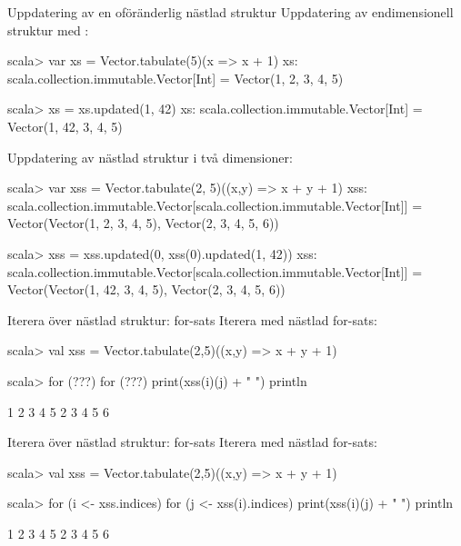 \begin{Slide}{Uppdatering av en oföränderlig nästlad struktur}\SlideFontSmall
Uppdatering av endimensionell struktur med :\\
{\SlideFontTiny{} }
\begin{REPL}
scala> var xs = Vector.tabulate(5)(x => x + 1)
xs: scala.collection.immutable.Vector[Int] = Vector(1, 2, 3, 4, 5)

scala> xs = xs.updated(1, 42)
xs: scala.collection.immutable.Vector[Int] = Vector(1, 42, 3, 4, 5)
\end{REPL}

Uppdatering av nästlad struktur i två dimensioner:
\begin{REPL}
scala> var xss = Vector.tabulate(2, 5)((x,y) => x + y + 1)
xss:
  scala.collection.immutable.Vector[scala.collection.immutable.Vector[Int]] =
  Vector(Vector(1, 2, 3, 4, 5), Vector(2, 3, 4, 5, 6))

scala> xss = xss.updated(0, xss(0).updated(1, 42))
xss:
  scala.collection.immutable.Vector[scala.collection.immutable.Vector[Int]] =
  Vector(Vector(1, 42, 3, 4, 5), Vector(2, 3, 4, 5, 6))
\end{REPL}

\end{Slide}


\begin{Slide}{Iterera över nästlad struktur: for-sats}\SlideFontSmall
Iterera med nästlad for-sats:
\begin{REPL}
scala> val xss = Vector.tabulate(2,5)((x,y) => x + y + 1)

scala> for (???) {
         for (???) {
           print(xss(i)(j) + " ")
         }
         println
       }

1 2 3 4 5
2 3 4 5 6
\end{REPL}
\end{Slide}

\begin{Slide}{Iterera över nästlad struktur: for-sats}\SlideFontSmall
Iterera med nästlad for-sats:
\begin{REPL}
scala> val xss = Vector.tabulate(2,5)((x,y) => x + y + 1)

scala> for (i <- xss.indices) {
         for (j <- xss(i).indices) {
           print(xss(i)(j) + " ")
         }
         println
       }

1 2 3 4 5
2 3 4 5 6
\end{REPL}
\end{Slide}


